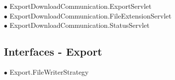 {	\hspace{1.0cm} $\bullet$ ExportDownloadCommunication.ExportServlet {\tiny {}} \\
	\hspace{1.0cm} $\bullet$ ExportDownloadCommunication.FileExtensionServlet {\tiny {}} \\
	\hspace{1.0cm} $\bullet$ ExportDownloadCommunication.StatusServlet {\tiny {}} \\
}
\subsection*{Interfaces - Export}
\hspace{0.0cm} $\bullet$ Export.FileWriterStrategy {\tiny {}} \\